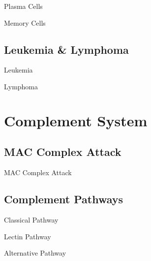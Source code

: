 \documentclass[10pt]{article}
\begin{document}
      \begin{core}{Plasma Cells}

      \end{core}

      \begin{core}{Memory Cells}

      \end{core}

  \subsection{Leukemia \& Lymphoma}
    
    \begin{core}{Leukemia}

    \end{core}

    \begin{core}{Lymphoma}

    \end{core}

\section{Complement System}
  
  \subsection{MAC Complex Attack}

    \begin{core}{MAC Complex Attack}

    \end{core}

  \subsection{Complement Pathways}

    \begin{core}{Classical Pathway}

    \end{core}

    \begin{core}{Lectin Pathway}

    \end{core}

    \begin{core}{Alternative Pathway}

    \end{core}
\end{document}
